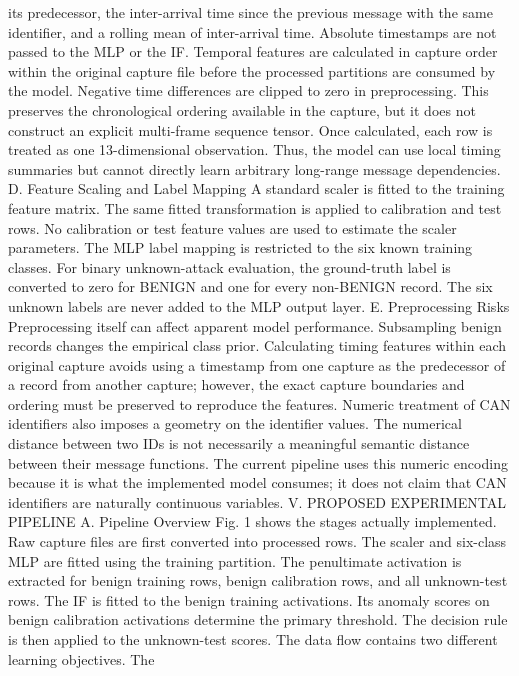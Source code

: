 \documentclass[
]{article}
\begin{document}
its predecessor, the inter-arrival time since the previous message with
the same identifier, and a rolling mean of inter-arrival time. Absolute
timestamps are not passed to the MLP or the IF. Temporal features are
calculated in capture order within the original capture file before the
processed partitions are consumed by the model. Negative time
differences are clipped to zero in preprocessing. This preserves the
chronological ordering available in the capture, but it does not
construct an explicit multi-frame sequence tensor. Once calculated, each
row is treated as one 13-dimensional observation. Thus, the model can
use local timing summaries but cannot directly learn arbitrary
long-range message dependencies. D. Feature Scaling and Label Mapping A
standard scaler is fitted to the training feature matrix. The same
fitted transformation is applied to calibration and test rows. No
calibration or test feature values are used to estimate the scaler
parameters. The MLP label mapping is restricted to the six known
training classes. For binary unknown-attack evaluation, the ground-truth
label is converted to zero for BENIGN and one for every non-BENIGN
record. The six unknown labels are never added to the MLP output layer.
E. Preprocessing Risks Preprocessing itself can affect apparent model
performance. Subsampling benign records changes the empirical class
prior. Calculating timing features within each original capture avoids
using a timestamp from one capture as the predecessor of a record from
another capture; however, the exact capture boundaries and ordering must
be preserved to reproduce the features. Numeric treatment of CAN
identifiers also imposes a geometry on the identifier values. The
numerical distance between two IDs is not necessarily a meaningful
semantic distance between their message functions. The current pipeline
uses this numeric encoding because it is what the implemented model
consumes; it does not claim that CAN identifiers are naturally
continuous variables. V. PROPOSED EXPERIMENTAL PIPELINE A. Pipeline
Overview Fig. 1 shows the stages actually implemented. Raw capture files
are first converted into processed rows. The scaler and six-class MLP
are fitted using the training partition. The penultimate activation is
extracted for benign training rows, benign calibration rows, and all
unknown-test rows. The IF is fitted to the benign training activations.
Its anomaly scores on benign calibration activations determine the
primary threshold. The decision rule is then applied to the unknown-test
scores. The data flow contains two different learning objectives. The
\end{document}
